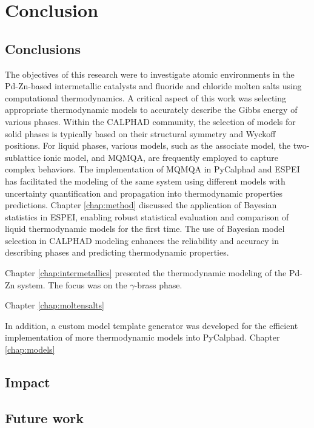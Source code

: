 \chapter{Conclusion} \label{chap:conclusion}

\section{Conclusions} \label{conclusion:sec:conclusions}
The objectives of this research were to investigate atomic environments in the Pd-Zn-based intermetallic catalysts and fluoride and chloride molten salts using computational thermodynamics. A critical aspect of this work was selecting appropriate thermodynamic models to accurately describe the Gibbs energy of various phases. Within the CALPHAD community, the selection of models for solid phases is typically based on their structural symmetry and Wyckoff positions. For liquid phases, various models, such as the associate model, the two-sublattice ionic model, and MQMQA, are frequently employed to capture complex behaviors. The implementation of MQMQA in PyCalphad and ESPEI has facilitated the modeling of the same system using different models with uncertainty quantification and propagation into thermodynamic properties predictions. Chapter \ref{chap:method} discussed the application of Bayesian statistics in ESPEI, enabling robust statistical evaluation and comparison of liquid thermodynamic models for the first time. The use of Bayesian model selection in CALPHAD modeling enhances the reliability and accuracy in describing phases and predicting thermodynamic properties. 

Chapter \ref{chap:intermetallics} presented the thermodynamic modeling of the Pd-Zn system. The focus was on the $\gamma$-brass phase. 

Chapter \ref{chap:moltensalts}

In addition, a custom model template generator was developed for the efficient implementation of more thermodynamic models into PyCalphad. Chapter \ref{chap:models}



\section{Impact} \label{conclusion:sec:impact}



\section{Future work} \label{conclusion:sec:future}
